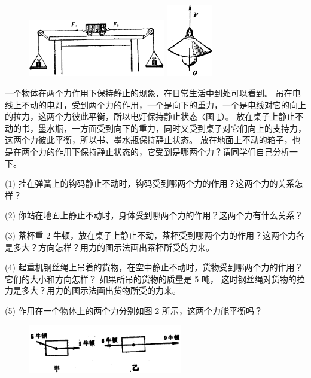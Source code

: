 \begin{figure}[htbp]
    \centering
    \begin{minipage}{7cm}
    \centering
    \includegraphics[width=6cm]{../pic/czwl1-ch2-18}
    \caption{}\label{fig:2-18}
    \end{minipage}
    \qquad
    \begin{minipage}{2cm}
    \centering
    \includegraphics[width=2cm]{../pic/czwl1-ch2-19}
    \caption{}\label{fig:2-19}
    \end{minipage}
\end{figure}

一个物体在两个力作用下保持静止的现象，在日常生活中到处可以看到。
吊在电线上不动的电灯，受到两个力的作用，一个是向下的重力，一个是电线对它的向上的拉力，这两个力彼此平衡，所以电灯保持静止状态〈图 \ref{fig:2-19}）。
放在桌子上静止不动的书，墨水瓶，一方面受到向下的重力，同时又受到桌子对它们向上的支持力，这两个力彼此平衡，所以书、墨水瓶保持静止状态。
放在地面上不动的箱子，也是在两个力的作用下保持静止状态的，它受到是哪两个力？请同学们自己分析一下。


\lianxi

(1) 挂在弹簧上的钩码静止不动时，钩码受到哪两个力的作用？这两个力的关系怎样？

(2) 你站在地面上静止不动时，身体受到哪两个力的作用？这两个力有什么关系？

(3) 茶杯重 2 牛顿，放在桌子上静止不动，茶杯受到哪两个力的作用？这两个力各是多大？方向怎样？用力的图示法画出茶杯所受的力来。

(4) 起重机钢丝绳上吊着的货物，在空中静止不动时，货物受到哪两个力的作用？它们的大小和方向怎样？
如果所吊的货物的质量是 5 吨， 这时钢丝绳对货物的拉力是多大？用力的图示法画出货物所受的力来。

(5) 作用在一个物体上的两个力分别如图 \ref{fig:2-20} 所示，这两个力能平衡吗？

\begin{figure}[htbp]
    \centering
    \includegraphics[width=0.6\textwidth]{../pic/czwl1-ch2-20}
    \caption{}\label{fig:2-20}
\end{figure}

